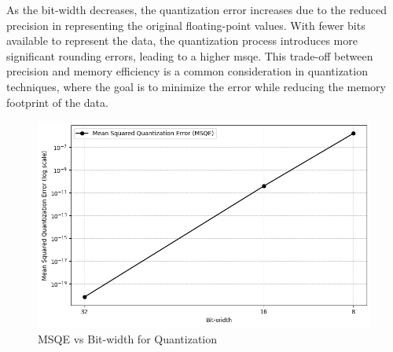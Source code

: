 As the bit-width decreases, the quantization error increases due to the reduced precision in representing the original floating-point values. With fewer bits available to represent the data, the quantization process introduces more significant rounding errors, leading to a higher \gls{msqe}. This trade-off between precision and memory efficiency is a common consideration in quantization techniques, where the goal is to minimize the error while reducing the memory footprint of the data.

\begin{figure}[H]
    \centering
    \includegraphics[width=\linewidth]{assets/quantization/MSQE_Quantization.png}
    \caption{MSQE vs Bit-width for Quantization}
    \label{fig:msqe-vs-bitwidth}
\end{figure}

\pagebreak


